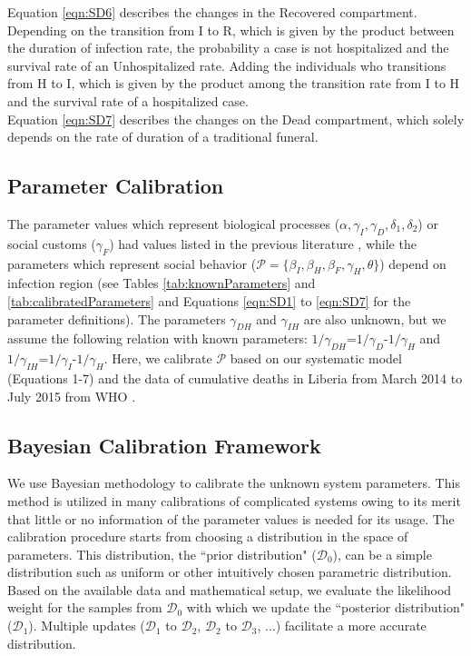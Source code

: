Equation \ref{eqn:SD6} describes the changes in the Recovered compartment. Depending on the transition from I to R, which is given by the product between the duration of infection rate, the probability a case is not hospitalized and the survival rate of an Unhospitalized rate. Adding  the individuals who transitions from H to I, which is given by the product among the transition rate from I to H and the survival rate of a hospitalized case.\\

Equation \ref{eqn:SD7} describes the changes on the Dead compartment, which solely depends on the rate of duration of a traditional funeral.\\





\subsection{Parameter Calibration}

The parameter values which represent biological processes ($\alpha, \gamma_{I}, \gamma_{D}, \delta_{1}, \delta_{2}$) or social customs ($\gamma_{F}$) had values listed in the previous literature \cite{Poletto2014, Webb2015}, while the parameters which represent social behavior ($\mathcal{P}=\{\beta_{I}, \beta_{H}, \beta_{F}, \gamma_{H}, \theta\}$) depend on infection region (see Tables \ref{tab:knownParameters} and \ref{tab:calibratedParameters} and Equations \ref{eqn:SD1} to \ref{eqn:SD7} for the parameter definitions). The parameters $\gamma_{DH}$ and $\gamma_{IH}$ are also unknown, but we assume the following relation with known parameters: $1/\gamma_{DH}$=$1/\gamma_{D}$-$1/\gamma_{H}$ and $1/\gamma_{IH}$=$1/\gamma_{I}$-$1/\gamma_{H}$. Here, we calibrate $\mathcal{P}$ based on our systematic model (Equations 1-7) and the data of cumulative deaths in Liberia from March 2014 to July 2015 from WHO \cite{CDCData}.


\subsection{Bayesian Calibration Framework}
We use Bayesian methodology to calibrate the unknown system parameters. This method is utilized in many calibrations of complicated systems owing to its merit that little or no information of the parameter values is needed for its usage. The calibration procedure starts from choosing a distribution in the space of parameters. This distribution, the ``prior distribution" ($\mathcal{D}_0$), can be a simple distribution such as uniform or other intuitively chosen parametric distribution. Based on the available data and mathematical setup, we evaluate the likelihood weight for the samples from $\mathcal{D}_0$ with which we update the ``posterior distribution" ($\mathcal{D}_1$). Multiple updates ($\mathcal{D}_1$ to $\mathcal{D}_2$, $\mathcal{D}_2$ to $\mathcal{D}_3$, ...) facilitate a more accurate distribution.

